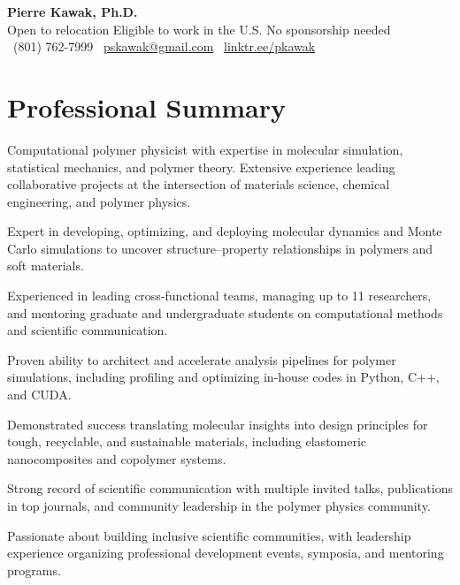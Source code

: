 \documentclass[letterpaper,12pt]{article}
\begin{document}
\begin{center}
  {\LARGE \textbf{Pierre Kawak, Ph.D.}}\\ \vspace{2mm}
  Open to relocation \quad Eligible to work in the U.S. \quad No sponsorship needed \\ \vspace{1.5mm}
  \faPhone\ (801) 762-7999 \quad \faEnvelope\ \href{mailto:pskawak@gmail.com}{pskawak@gmail.com} \quad \faLink\ \href{https://linktr.ee/pkawak}{linktr.ee/pkawak}
\end{center}

\vspace{-0.3\baselineskip}
\section*{Professional Summary}
Computational polymer physicist with expertise in molecular simulation, statistical mechanics, and polymer theory. Extensive experience leading collaborative projects at the intersection of materials science, chemical engineering, and polymer physics.
\vspace{0.5em}
\begin{tabitemize}[leftmargin=*]
    \item Expert in developing, optimizing, and deploying molecular dynamics and Monte Carlo simulations to uncover structure–property relationships in polymers and soft materials.
    \item Experienced in leading cross-functional teams, managing up to 11 researchers, and mentoring graduate and undergraduate students on computational methods and scientific communication.
    \item Proven ability to architect and accelerate analysis pipelines for polymer simulations, including profiling and optimizing in-house codes in Python, C++, and CUDA.
    \item Demonstrated success translating molecular insights into design principles for tough, recyclable, and sustainable materials, including elastomeric nanocomposites and copolymer systems.
    \item Strong record of scientific communication with multiple invited talks, publications in top journals, and community leadership in the polymer physics community.
    \item Passionate about building inclusive scientific communities, with leadership experience organizing professional development events, symposia, and mentoring programs.
\end{tabitemize}
\end{document}
